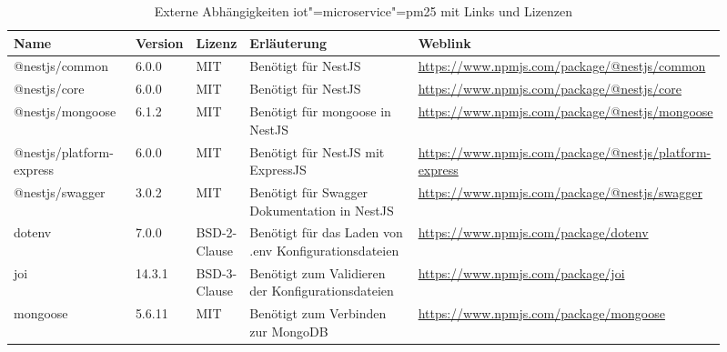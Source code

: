 \begin{landscape}
\begin{table}[htb]
	\caption{Externe Abhängigkeiten iot"=microservice"=pm25 mit Links und Lizenzen}
	\begin{tabular}{|p{0.18\linewidth}|p{0.06\linewidth}|p{0.06\linewidth}|p{0.28\linewidth}|p{0.33\linewidth}|}
		\hline
		Name & Version & Lizenz & Erläuterung & Weblink \\ \hline
		@nestjs/common & 6.0.0 & MIT & Benötigt für NestJS & \small\url{https://www.npmjs.com/package/@nestjs/common} \\ \hline
		@nestjs/core & 6.0.0 & MIT & Benötigt für NestJS & \small\url{https://www.npmjs.com/package/@nestjs/core} \\ \hline
		@nestjs/mongoose & 6.1.2 & MIT & Benötigt für mongoose in NestJS & \small\url{https://www.npmjs.com/package/@nestjs/mongoose} \\ \hline
		@nestjs/platform-express & 6.0.0 & MIT & Benötigt für NestJS mit ExpressJS & \small\url{https://www.npmjs.com/package/@nestjs/platform-express} \\ \hline
		@nestjs/swagger & 3.0.2 & MIT & Benötigt für Swagger Dokumentation in NestJS & \small\url{https://www.npmjs.com/package/@nestjs/swagger} \\ \hline
		dotenv & 7.0.0 & BSD-2-Clause & Benötigt für das Laden von .env Konfigurationsdateien & \small\url{https://www.npmjs.com/package/dotenv} \\ \hline
		joi & 14.3.1 & BSD-3-Clause & Benötigt zum Validieren der Konfigurationsdateien & \small\url{https://www.npmjs.com/package/joi} \\ \hline
		mongoose & 5.6.11 & MIT & Benötigt zum Verbinden zur MongoDB & \small\url{https://www.npmjs.com/package/mongoose} \\ \hline
	\end{tabular}
	\label{tbl:dependenciesMicroPM25}
\end{table}


\end{landscape}

